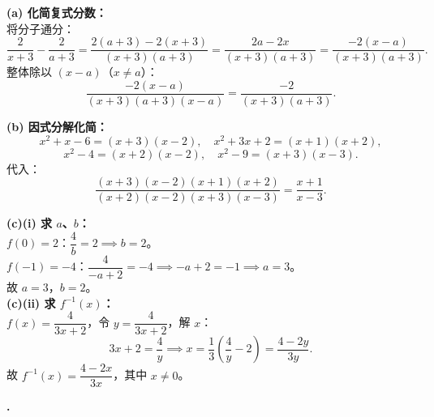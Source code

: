 \documentclass[12pt,a4paper]{ctexart}
\newcounter{qnum}
\newenvironment{question}
  {%
    \stepcounter{qnum}%
    \vspace{0.8em}%
    \noindent\textbf{\theqnum.}\enspace
  }
  {\par\vspace{0.4em}}
\newenvironment{solution}
  {%
    \par\noindent
  }
  {\par}
\begin{document}
\begin{solution}
    \textbf{(a) 化简复式分数：} \\
    将分子通分：
    \[
        \frac{2}{x+3}-\frac{2}{a+3} = \frac{2(a+3)-2(x+3)}{(x+3)(a+3)} = \frac{2a-2x}{(x+3)(a+3)} = \frac{-2(x-a)}{(x+3)(a+3)}.
    \]
    整体除以 $(x-a)$（$x \ne a$）：
    \[
        \frac{-2(x-a)}{(x+3)(a+3)(x-a)} = \frac{-2}{(x+3)(a+3)}.
    \]

    \textbf{(b) 因式分解化简：} \\
    \[
        x^2+x-6 = (x+3)(x-2),\quad x^2+3x+2 = (x+1)(x+2),
    \]
    \[
        x^2-4 = (x+2)(x-2),\quad x^2-9 = (x+3)(x-3).
    \]
    代入：
    \[
        \frac{(x+3)(x-2)(x+1)(x+2)}{(x+2)(x-2)(x+3)(x-3)} = \frac{x+1}{x-3}.
    \]

    \textbf{(c)(i) 求 $a$、$b$：} \\
    $f(0) = 2$：$\dfrac{4}{b} = 2 \implies b = 2$。\\
    $f(-1) = -4$：$\dfrac{4}{-a+2} = -4 \implies -a+2 = -1 \implies a = 3$。\\
    故 $a = 3$，$b = 2$。\\

    \textbf{(c)(ii) 求 $f^{-1}(x)$：} \\
    $f(x) = \dfrac{4}{3x+2}$，令 $y = \dfrac{4}{3x+2}$，解 $x$：
    \[
        3x+2 = \frac{4}{y} \implies x = \frac{1}{3}\!\left(\frac{4}{y}-2\right) = \frac{4-2y}{3y}.
    \]
    故 $f^{-1}(x) = \dfrac{4-2x}{3x}$，其中 $x \ne 0$。
\end{solution}

\begin{question}
\end{question}
\end{document}

